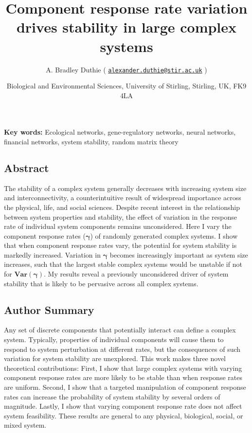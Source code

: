 \documentclass[]{article}
\title{Component response rate variation drives stability in large complex
systems}
\author{A. Bradley Duthie (
\href{mailto:alexander.duthie@stir.ac.uk}{\nolinkurl{alexander.duthie@stir.ac.uk}}
)}
\date{Biological and Environmental Sciences, University of Stirling, Stirling,
UK, FK9 4LA}
\begin{document}
\maketitle

\textbf{Key words:} Ecological networks, gene-regulatory networks,
neural networks, financial networks, system stability, random matrix
theory

\subsection{Abstract}\label{abstract}

The stability of a complex system generally decreases with increasing
system size and interconnectivity, a counterintuitive result of
widespread importance across the physical, life, and social sciences.
Despite recent interest in the relationship between system properties
and stability, the effect of variation in the response rate of
individual system components remains unconsidered. Here I vary the
component response rates (\(\boldsymbol{\gamma}\)) of randomly generated
complex systems. I show that when component response rates vary, the
potential for system stability is markedly increased. Variation in
\(\boldsymbol{\gamma}\) becomes increasingly important as system size
increases, such that the largest stable complex systems would be
unstable if not for \(\boldsymbol{Var(\gamma)}\). My results reveal a
previously unconsidered driver of system stability that is likely to be
pervasive across all complex systems.

\subsection{Author Summary}\label{author-summary}

Any set of discrete components that potentially interact can define a
complex system. Typically, properties of individual components will
cause them to respond to system perturbation at different rates, but the
consequences of such variation for system stability are unexplored. This
work makes three novel theoretical contributions: First, I show that
large complex systems with varying component response rates are more
likely to be stable than when response rates are uniform. Second, I show
that a targeted manipulation of component response rates can increase
the probability of system stability by several orders of magnitude.
Lastly, I show that varying component response rate does not affect
system feasibility. These results are general to any physical,
biological, social, or mixed system.
\end{document}
